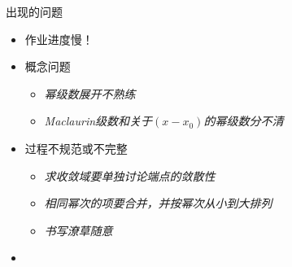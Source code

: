 \begin{frame}{出现的问题}
	\linespread{1.5}
	  \begin{itemize}%
	    \item 作业进度慢！
	    \item 概念问题
	    \begin{itemize}
	      \item \b\it 幂级数展开不熟练
	      \item \b\it Maclaurin级数和关于$(x-x_0)$的幂级数分不清
	    \end{itemize}
	    \item 过程不规范或不完整
	    \begin{itemize}
	      \item \b\it 求收敛域要单独讨论端点的敛散性
	      \item \b\it 相同幂次的项要合并，并按幂次从小到大排列
	      \item \b\it 书写潦草随意\pause
	    \end{itemize}
	    \item {}
	  \end{itemize}
\end{frame}

% 	
% 	
